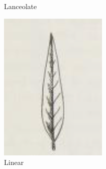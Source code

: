\documentclass[12pt,english]{article}
\begin{document}
\begin{figure}[!hbt]
\begin{centre}
	\begin{minipage}{0.19\textwidth}
		\caption{Lanceolate}
		\includegraphics[width=\textwidth]{../code/contour/original/lanceolate}
	\end{minipage}
	\begin{minipage}{0.19\textwidth}
		\caption{Linear}

\end{minipage}
\end{centre}
\end{figure}
\end{document}
